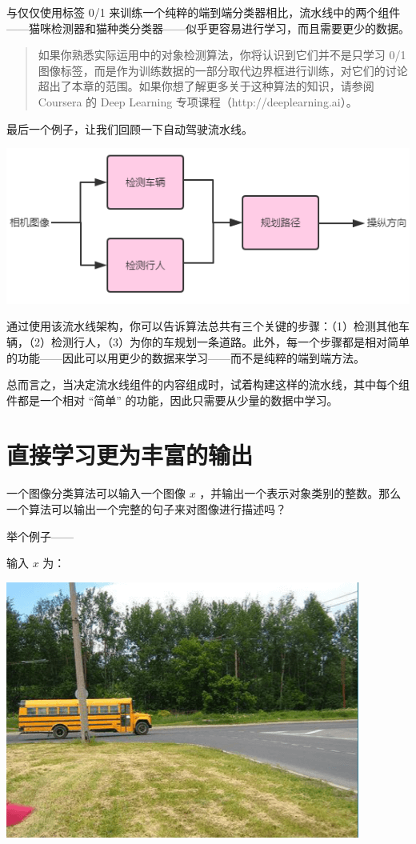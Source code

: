 与仅仅使用标签 0/1
来训练一个纯粹的端到端分类器相比，流水线中的两个组件------猫咪检测器和猫种类分类器------似乎更容易进行学习，而且需要更少的数据。

\begin{quote}
如果你熟悉实际运用中的对象检测算法，你将认识到它们并不是只学习 0/1
图像标签，而是作为训练数据的一部分取代边界框进行训练，对它们的讨论超出了本章的范围。如果你想了解更多关于这种算法的知识，请参阅
Coursera 的 Deep Learning 专项课程（http://deeplearning.ai）。
\end{quote}

最后一个例子，让我们回顾一下自动驾驶流水线。

\includegraphics{./img/ch48_03.png}

通过使用该流水线架构，你可以告诉算法总共有三个关键的步骤：（1）检测其他车辆，（2）检测行人，（3）为你的车规划一条道路。此外，每一个步骤都是相对简单的功能------因此可以用更少的数据来学习------而不是纯粹的端到端方法。

总而言之，当决定流水线组件的内容组成时，试着构建这样的流水线，其中每个组件都是一个相对
``简单'' 的功能，因此只需要从少量的数据中学习。

\hypertarget{ux76f4ux63a5ux5b66ux4e60ux66f4ux4e3aux4e30ux5bccux7684ux8f93ux51fa}{%
\chapter{直接学习更为丰富的输出}\label{ux76f4ux63a5ux5b66ux4e60ux66f4ux4e3aux4e30ux5bccux7684ux8f93ux51fa}}

一个图像分类算法可以输入一个图像 \(x\)
，并输出一个表示对象类别的整数。那么一个算法可以输出一个完整的句子来对图像进行描述吗？

举个例子------

输入 \(x\) 为：

\includegraphics{./img/ch52_01.png}

